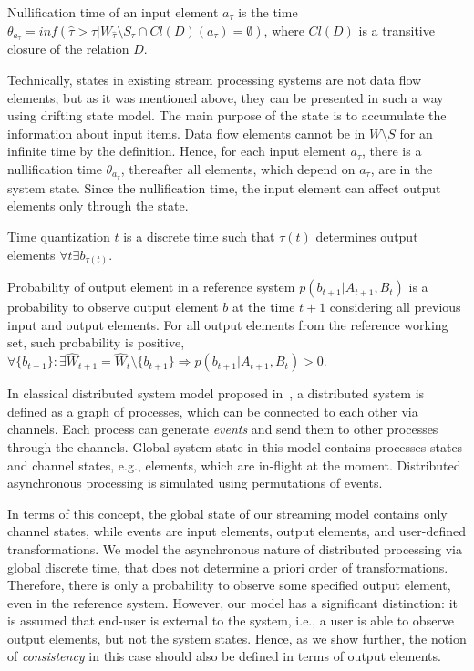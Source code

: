 \begin{definition}{Nullification time}
of an input element $a_\tau$ is the time $\theta_{a_\tau}=inf(\hat{\tau}>\tau|W_{\hat{\tau}}\setminus{S_{\hat{\tau}}}\cap{Cl(D)(a_\tau)=\emptyset})$, where $Cl(D)$ is a transitive closure of the relation $D$.
\end{definition}

Technically, states in existing stream processing systems are not data flow elements, but as it was mentioned above, they can be presented in such a way using drifting state model. The main purpose of the state is to accumulate the information about input items. Data flow elements cannot be in $W\setminus{S}$ for an infinite time by the definition. Hence, for each input element $a_\tau$, there is a nullification time $\theta_{a_\tau}$, thereafter all elements, which depend on $a_\tau$, are in the system state. Since the nullification time, the input element can affect output elements only through the state.

\begin{definition}{Time quantization}
$t$ is a discrete time such that $\tau(t)$ determines output elements $\forall{t}\exists{b_{\tau(t)}}$.
\end{definition}

\begin{definition}{Probability of output element in a reference system}
$p(b_{t+1}|A_{t+1}, B_t)$ is a probability to observe output element $b$ at the time $t+1$ considering all previous input and output elements. For all output elements from the reference working set, such probability is positive,\\
$\forall{\{b_{t+1}\}:\exists{\widehat{W}_{t+1}=\widehat{W}_{t}\setminus{\{b_{t+1}\}}}} \Rightarrow p(b_{t+1}|A_{t+1}, B_t) > 0$.
\end{definition}

In classical distributed system model proposed in~\cite{Chandy:1985:DSD:214451.214456}, a distributed system is defined as a graph of processes, which can be connected to each other via channels. Each process can generate {\em events} and send them to other processes through the channels. Global system state in this model contains processes states and channel states, e.g., elements, which are in-flight at the moment. Distributed asynchronous processing is simulated using permutations of events. 

In terms of this concept, the global state of our streaming model contains only channel states, while events are input elements, output elements, and user-defined transformations. We model the asynchronous nature of distributed processing via global discrete time, that does not determine a priori order of transformations. Therefore, there is only a probability to observe some specified output element, even in the reference system. However, our model has a significant distinction: it is assumed that end-user is external to the system, i.e., a user is able to observe output elements, but not the system states. Hence, as we show further, the notion of {\em consistency} in this case should also be defined in terms of output elements.  

